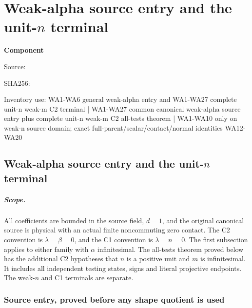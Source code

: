 \chapter{Weak-alpha source entry and the unit-\(n\) terminal}
\label{component:p3a3949869b9e}
\noindent\textbf{Component }\par
{\small\noindent Source: \par}
{\small\noindent SHA256: \par}
{\small\noindent Inventory use: WA1-WA6 general weak-alpha entry and WA1-WA27 complete unit-n weak-m C2 terminal | WA1-WA27 common canonical weak-alpha source entry plus complete unit-n weak-m C2 all-tests theorem | WA1-WA10 only on weak-n source domain; exact full-parent/scalar/contact/normal identities WA12-WA20\par}
\medskip
\section{Weak-alpha source entry and the unit-\(n\) terminal}
\label{p3a3949869b9e:sec:new-weak-alpha-unit-n}

\paragraph{Scope.}
All coefficients are bounded in the source field, \(d=1\), and the
original canonical source is physical with an actual finite noncommuting
zero contact. The C2 convention is \(\lambda=\beta=0\), and the C1
convention is \(\lambda=n=0\). The first subsection applies to either
family with \(\alpha\) infinitesimal. The all-tests theorem proved below
has the additional C2 hypotheses that \(n\) is a positive unit and \(m\)
is infinitesimal. It includes all independent testing states, signs and
literal projective endpoints. The weak-\(n\) and C1 terminals are separate.

\subsection{Source entry, proved before any shape quotient is used}

